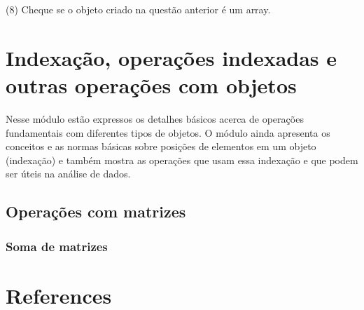 \documentclass[
  letterpaper,
  DIV=11,
  numbers=noendperiod]{scrreprt}
\newlength{\cslhangindent}
\newenvironment{CSLReferences}[2] %
 {\begin{list}{}{%
  \setlength{\itemindent}{0pt}
  \setlength{\leftmargin}{0pt}
  \setlength{\parsep}{0pt}
  \ifodd #1
   \setlength{\leftmargin}{\cslhangindent}
   \setlength{\itemindent}{-1\cslhangindent}
  \fi
  \setlength{\itemsep}{#2\baselineskip}}}
 {\end{list}}
\begin{document}
(8) Cheque se o objeto criado na questão anterior é um array.


\chapter{Indexação, operações indexadas e outras operações com
objetos}\label{indexauxe7uxe3o-operauxe7uxf5es-indexadas-e-outras-operauxe7uxf5es-com-objetos}

Nesse módulo estão expressos os detalhes básicos acerca de operações
fundamentais com diferentes tipos de objetos. O módulo ainda apresenta
os conceitos e as normas básicas sobre posições de elementos em um
objeto (indexação) e também mostra as operações que usam essa indexação
e que podem ser úteis na análise de dados.

\section{Operações com matrizes}\label{operauxe7uxf5es-com-matrizes}

\subsection{Soma de matrizes}\label{soma-de-matrizes}


\chapter*{References}\label{references}


\label{refs}
\begin{CSLReferences}{0}{1}
\end{CSLReferences}
\end{document}
